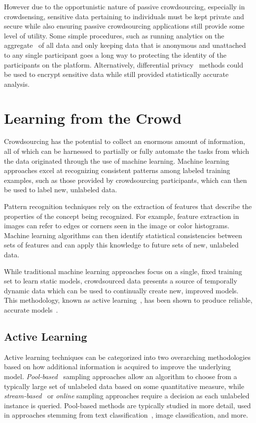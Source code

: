 \documentclass[10pt,twocolumn]{article}
\begin{document}
However due to the opportunistic nature of passive crowdsourcing, 
especially in crowdsensing, sensitive data pertaining to individuals must
be kept private and secure while also ensuring passive crowdsourcing
applications still provide some level of utility. Some simple procedures,
such as running analytics on the aggregate~\cite{Ganti2011} of all 
data and only keeping data that is anonymous and unattached to any 
single participant goes a long way to protecting the identity of the 
participants on the platform. Alternatively, differential 
privacy~\cite{Dwork2006} methods could be used to encrypt 
sensitive data while still provided statistically accurate
analysis.

\section{Learning from the Crowd}
\label{sec:learning}
Crowdsourcing has the potential to collect an enormous amount of
information, all of which can be harnessed to partially or fully 
automate the tasks from which the data originated through the use of 
machine learning. Machine learning approaches excel at recognizing
consistent patterns among labeled training examples, such as those
provided by crowdsourcing participants, which can then be used to 
label new, unlabeled data.

Pattern recognition techniques rely on the extraction of features
that describe the properties of the concept being recognized. For
example, feature extraction in images can refer to edges or corners 
seen in the image or color histograms. Machine learning algorithms
can then identify statistical consistencies between sets of
features and can apply this knowledge to future sets of new,
unlabeled data.

While traditional machine learning approaches focus on a single,
fixed training set to learn static models, crowdsourced data presents
a source of temporally dynamic data which can be used to continually
create new, improved models. This methodology, known as active 
learning~\cite{Druck2009,Settles2010}, has been shown to produce reliable,
accurate models~\cite{Barrington2012,Brew2010}.


\subsection{Active Learning}
Active learning techniques can be categorized into two overarching 
methodologies based on how additional information is acquired to 
improve the underlying model. \textit{Pool-based}~\cite{McCallum1998} 
sampling approaches allow an algorithm to choose from a typically large set
of unlabeled data based on some quantitative measure, while 
\textit{stream-based}~\cite{Freund1997} or \textit{online} sampling approaches 
require a decision as each unlabeled instance is queried. Pool-based methods 
are typically studied in more detail, used in approaches stemming from text
classification~\cite{Lewis1994,Yan2011}, image classification, and more.
\end{document}
